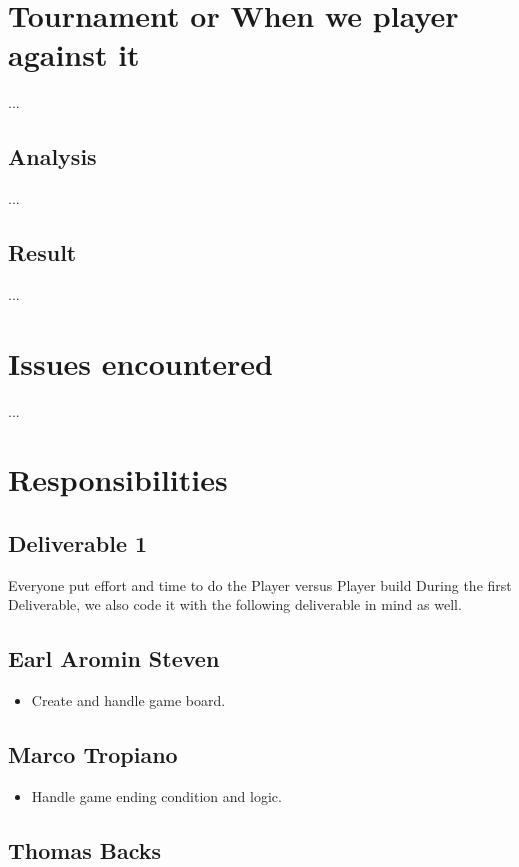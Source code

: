 \documentclass[runningheads]{llncs}
\begin{document}
\section{Tournament or When we player against it}
...
\subsection{Analysis}
...
\subsection{Result}
...

\section{Issues encountered}
...
\section{Responsibilities}
\subsection{Deliverable 1}
Everyone put effort and time to do the Player versus Player build
During the first Deliverable, we also code it with the following
deliverable in mind as well.
\subsection{Earl Aromin Steven}
\begin{itemize}
    \item Create and handle game board.
\end{itemize}
\subsection{Marco Tropiano}
\begin{itemize}
    \item Handle game ending condition and logic.
\end{itemize}
\subsection{Thomas Backs}
\end{document}
